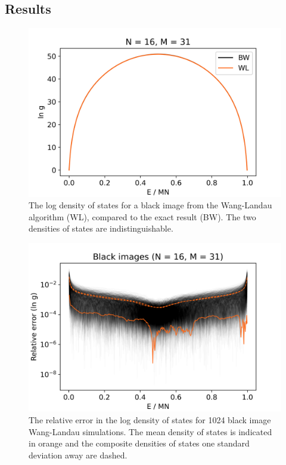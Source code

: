 \documentclass[aps,reprint,floatfix]{revtex4-2}
\theoremstyle{plain}
\theoremstyle{definition}
\begin{document}
\subsection{Results}\label{sec:wl-results}

\begin{figure}
  \centering
  \includegraphics[width=\linewidth]{wanglandau-bw}
  \caption{The log density of states for a black image from the Wang-Landau
    algorithm (WL), compared to the exact result (BW). The two densities of
  states are indistinguishable.}\label{fig:wl-bw}
\end{figure}

\begin{figure}
  \centering
  \includegraphics[width=\linewidth]{wanglandau-bw-relerror}
  \caption{The relative error in the log density of states for \num{1024} black
    image Wang-Landau simulations. The mean density of states is indicated
    in orange and the composite densities of states one standard deviation away
  are dashed.}\label{fig:wl-bw-relerror}
\end{figure}
\end{document}
